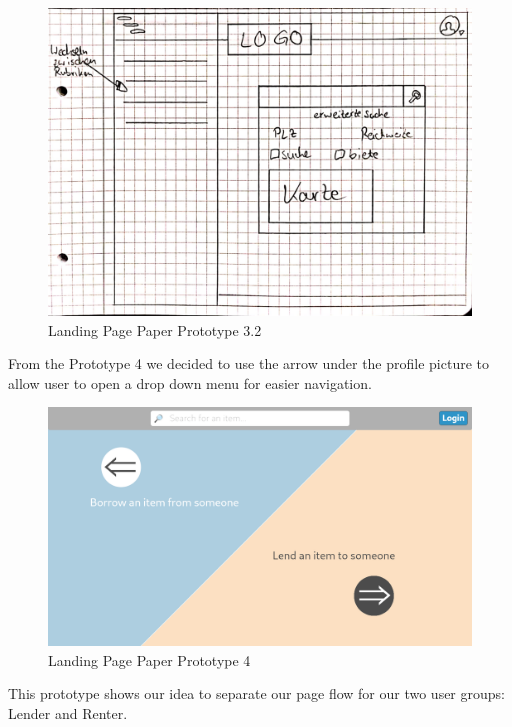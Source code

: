 			
			\begin{figure}[H]
				\centering
				\includegraphics[width=0.9\linewidth]{abb/6_Sketching and Paper Prototyping/Homepage4.png}
				\caption{Landing Page Paper Prototype 3.2}
				\label{fig:Homepage4}
			\end{figure}
			
			\noindent
			From the Prototype 4 we decided to use the arrow under the profile picture to allow user to open a drop down menu for easier navigation.
			
			\begin{figure}[H]
				\centering
				\includegraphics[width=\linewidth]{abb/6_Sketching and Paper Prototyping/Homepage5.png}
				\caption{Landing Page Paper Prototype 4}
				\label{fig:Homepage4}
			\end{figure}
			
			\noindent
			This prototype shows our idea to separate our page flow for our two user groups: Lender and Renter.
			